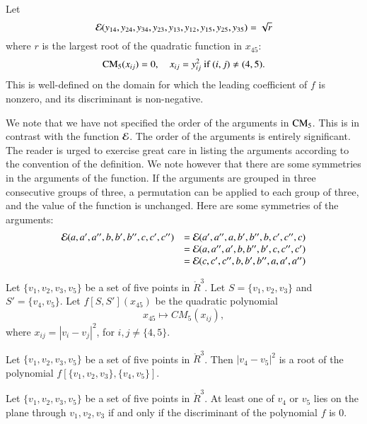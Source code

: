 \newpage
\begin{definition}[$\CalE$] 
Let 
$${\mathcal E}(y_{14},y_{24},y_{34},y_{23},y_{13},y_{12},y_{15},y_{25},y_{35})=\sqrt{r}$$
where $r$ is the largest root of the quadratic function in $x_{45}$:
	$$
	{\operatorname{CM}}_5(x_{ij}) = 0,\quad x_{ij} = y_{ij}^2 \hbox{ if } (i,j)\ne (4,5).
	$$
This is well-defined on the domain for which the leading coefficient of $f$ is nonzero, and its
discriminant is non-negative.  
\end{definition}

We note that we have not specified the order of the arguments in ${\operatorname{CM}}_5$.   This is in
contrast with the function $\CalE$.  The order of the arguments is entirely significant.
The reader is urged to exercise great care in listing the arguments according to the
convention of the definition.  We note however that there are some symmetries in the
arguments of the function.  
If the arguments are grouped in three consecutive groups of three, a permutation
can be applied to each group of three, and the value of the function is unchanged.  Here
are some symmetries of the arguments:
	$$
	\begin{array}{lll}
	{\mathcal E}(a,a',a'',b,b',b'',c,c',c'') &= {\mathcal E}(a',a'',a,b',b'',b,c',c'',c)\\
			&={\mathcal E}(a,a'',a',b,b'',b',c,c'',c')\\
			&= {\mathcal E}(c,c',c'',b,b',b'',a,a',a'')\\
	\end{array}
	$$

\begin{definition}[f]
Let $\{v_1,v_2,v_3,v_5\}$ be a set of five
points in $\ring{R}^3$.   Let $S=\{v_1,v_2,v_3\}$ and $S'=\{v_4,v_5\}$.
Let $f[S,S'](x_{45})$ be the quadratic polynomial 
   $$x_{45}\mapsto CM_5(x_{ij}),$$
where $x_{ij} = |v_i-v_j|^2$, for ${i,j}\ne \{4,5\}$.  
\end{definition}

\begin{lemma}
Let $\{v_1,v_2,v_3,v_5\}$ be a set of five
points in $\ring{R}^3$.  
Then $|v_4-v_5|^2$ is a root of the polynomial 
$f[\{v_1,v_2,v_3\},\{v_4,v_5\}]$. 
\end{lemma}


\begin{lemma}
Let $\{v_1,v_2,v_3,v_5\}$ be a set of five
points in $\ring{R}^3$.  
At least one of $v_4$ or $v_5$ lies on the plane through $v_1,v_2,v_3$ if and only if
the discriminant of the polynomial $f$ is $0$.
\end{lemma}

